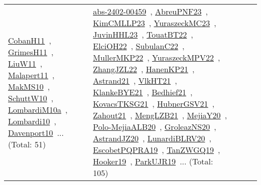 {\begin{longtable}{lp{3cm}>{\raggedright\arraybackslash}p{6cm}>{\raggedright\arraybackslash}p{6cm}>{\raggedright\arraybackslash}p{8cm}}
\href{../works/CobanH11.pdf}{CobanH11}~\cite{CobanH11}, \href{../works/GrimesH11.pdf}{GrimesH11}~\cite{GrimesH11}, \href{../works/LiuW11.pdf}{LiuW11}~\cite{LiuW11}, \href{../works/Malapert11.pdf}{Malapert11}~\cite{Malapert11}, \href{../works/MakMS10.pdf}{MakMS10}~\cite{MakMS10}, \href{../works/SchuttW10.pdf}{SchuttW10}~\cite{SchuttW10}, \href{../works/LombardiM10a.pdf}{LombardiM10a}~\cite{LombardiM10a}, \href{../works/Lombardi10.pdf}{Lombardi10}~\cite{Lombardi10}, \href{../works/Davenport10.pdf}{Davenport10}~\cite{Davenport10}... (Total: 51) & \href{../works/abs-2402-00459.pdf}{abs-2402-00459}~\cite{abs-2402-00459}, \href{../works/AbreuPNF23.pdf}{AbreuPNF23}~\cite{AbreuPNF23}, \href{../works/KimCMLLP23.pdf}{KimCMLLP23}~\cite{KimCMLLP23}, \href{../works/YuraszeckMC23.pdf}{YuraszeckMC23}~\cite{YuraszeckMC23}, \href{../works/JuvinHHL23.pdf}{JuvinHHL23}~\cite{JuvinHHL23}, \href{../works/TouatBT22.pdf}{TouatBT22}~\cite{TouatBT22}, \href{../works/ElciOH22.pdf}{ElciOH22}~\cite{ElciOH22}, \href{../works/SubulanC22.pdf}{SubulanC22}~\cite{SubulanC22}, \href{../works/MullerMKP22.pdf}{MullerMKP22}~\cite{MullerMKP22}, \href{../works/YuraszeckMPV22.pdf}{YuraszeckMPV22}~\cite{YuraszeckMPV22}, \href{../works/ZhangJZL22.pdf}{ZhangJZL22}~\cite{ZhangJZL22}, \href{../works/HanenKP21.pdf}{HanenKP21}~\cite{HanenKP21}, \href{../works/Astrand21.pdf}{Astrand21}~\cite{Astrand21}, \href{../works/VlkHT21.pdf}{VlkHT21}~\cite{VlkHT21}, \href{../works/KlankeBYE21.pdf}{KlankeBYE21}~\cite{KlankeBYE21}, \href{../works/Bedhief21.pdf}{Bedhief21}~\cite{Bedhief21}, \href{../works/KovacsTKSG21.pdf}{KovacsTKSG21}~\cite{KovacsTKSG21}, \href{../works/HubnerGSV21.pdf}{HubnerGSV21}~\cite{HubnerGSV21}, \href{../works/Zahout21.pdf}{Zahout21}~\cite{Zahout21}, \href{../works/MengLZB21.pdf}{MengLZB21}~\cite{MengLZB21}, \href{../works/MejiaY20.pdf}{MejiaY20}~\cite{MejiaY20}, \href{../works/Polo-MejiaALB20.pdf}{Polo-MejiaALB20}~\cite{Polo-MejiaALB20}, \href{../works/GroleazNS20.pdf}{GroleazNS20}~\cite{GroleazNS20}, \href{../works/AstrandJZ20.pdf}{AstrandJZ20}~\cite{AstrandJZ20}, \href{../works/LunardiBLRV20.pdf}{LunardiBLRV20}~\cite{LunardiBLRV20}, \href{../works/EscobetPQPRA19.pdf}{EscobetPQPRA19}~\cite{EscobetPQPRA19}, \href{../works/TanZWGQ19.pdf}{TanZWGQ19}~\cite{TanZWGQ19}, \href{../works/Hooker19.pdf}{Hooker19}~\cite{Hooker19}, \href{../works/ParkUJR19.pdf}{ParkUJR19}~\cite{ParkUJR19}... (Total: 105)\\

\end{longtable}}
